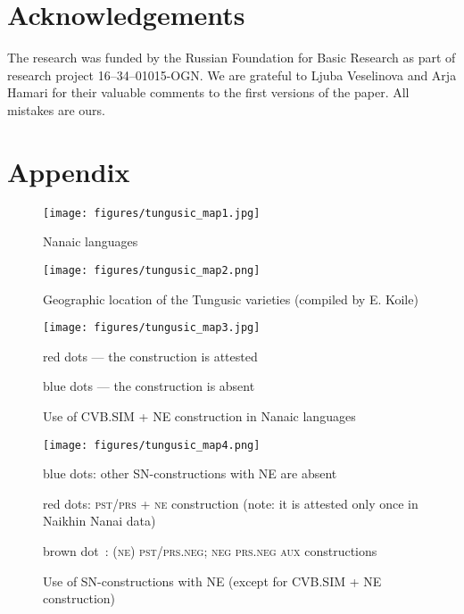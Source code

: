\documentclass[output=paper]{langscibook}
\begin{document}
\section*{Acknowledgements}
The research was funded by the Russian Foundation for Basic Research as part of research project 16--34--01015-OGN. We are grateful to Ljuba Veselinova and Arja Hamari for their valuable comments to the first versions of the paper. All mistakes are ours.

\section*{Appendix}

\begin{figure}
    \captionsetup{name=Map}
    \texttt{[image: figures/tungusic\_map1.jpg]}
    \caption{Nanaic languages}
    \label{fig:T1}
\end{figure}

\pagebreak
\newpage
\begin{figure}
    \captionsetup{name=Map}
    \texttt{[image: figures/tungusic\_map2.png]}
    \caption{Geographic location of the Tungusic varieties (compiled by E. Koile)}
    \label{fig:T2}
\end{figure}

\pagebreak
\newpage
\begin{figure}
    \captionsetup{name=Map}
    \texttt{[image: figures/tungusic\_map3.jpg]}
    \caption{Use of CVB.SIM + NE construction in Nanaic languages}
    \label{fig:T3}

    red dots — the construction is attested

    blue dots — the construction is absent

\end{figure}

\pagebreak
\newpage
\begin{figure}
    \captionsetup{name=Map}
    \texttt{[image: figures/tungusic\_map4.png]}
    \caption{Use of SN-constructions with NE (except for CVB.SIM + NE construction)}
    \label{fig:T4}

    blue dots: other SN-constructions with NE are absent

    red dots: \textsc{pst/prs + ne} construction (note: it is attested only once in Naikhin Nanai data)

    brown dot : \textsc{(ne) pst/prs.neg}; \textsc{neg prs.neg aux} constructions

\end{figure}



\pagebreak
\newpage
{\sloppy\printbibliography[heading=subbibliography,notkeyword=this]}
\end{document}
